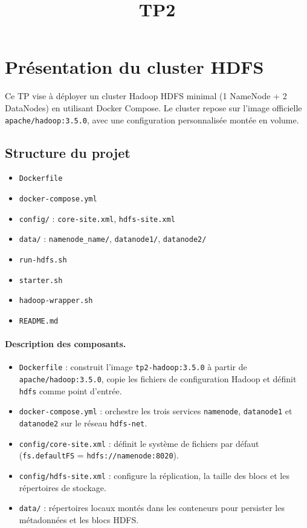 \documentclass[11pt,a4paper]{article}
\title{TP2}
\author{}
\date{}
\begin{document}


\section{Présentation du cluster HDFS}

Ce TP vise à déployer un cluster Hadoop HDFS minimal (1 NameNode + 2 DataNodes) en utilisant Docker Compose. Le cluster repose sur l'image officielle \texttt{apache/hadoop:3.5.0}, avec une configuration personnalisée montée en volume.

\subsection{Structure du projet}

\begin{itemize}
  \item \texttt{Dockerfile}
  \item \texttt{docker-compose.yml}
  \item \texttt{config/} : \texttt{core-site.xml}, \texttt{hdfs-site.xml}
  \item \texttt{data/} : \texttt{namenode\_name/}, \texttt{datanode1/}, \texttt{datanode2/}
  \item \texttt{run-hdfs.sh}
  \item \texttt{starter.sh}
  \item \texttt{hadoop-wrapper.sh}
  \item \texttt{README.md}
\end{itemize}

\paragraph{Description des composants.}
\begin{itemize}
  \item \texttt{Dockerfile} : construit l'image \texttt{tp2-hadoop:3.5.0} à partir de \texttt{apache/hadoop:3.5.0}, copie les fichiers de configuration Hadoop et définit \texttt{hdfs} comme point d'entrée.
  \item \texttt{docker-compose.yml} : orchestre les trois services \texttt{namenode}, \texttt{datanode1} et \texttt{datanode2} sur le réseau \texttt{hdfs-net}.
  \item \texttt{config/core-site.xml} : définit le système de fichiers par défaut (\texttt{fs.defaultFS} = \texttt{hdfs://namenode:8020}).
  \item \texttt{config/hdfs-site.xml} : configure la réplication, la taille des blocs et les répertoires de stockage.
  \item \texttt{data/} : répertoires locaux montés dans les conteneurs pour persister les métadonnées et les blocs HDFS.
\end{itemize}
\end{document}
